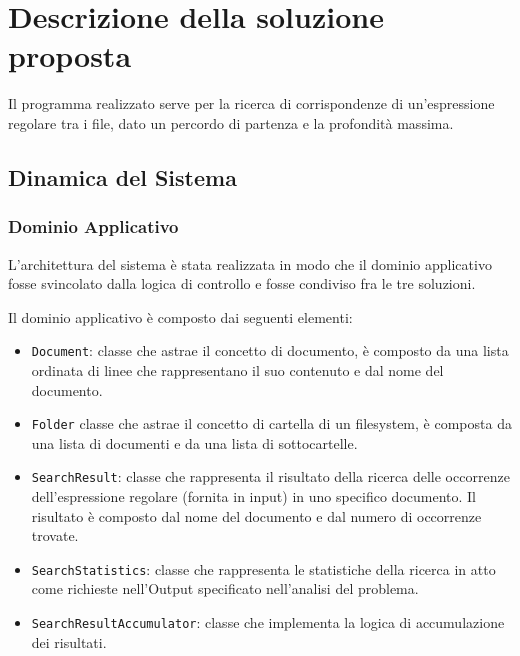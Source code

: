 \documentclass[a4paper]{article}
\begin{document}
\section{Descrizione della soluzione proposta}\label{descrizione-della-soluzione-proposta}

Il programma realizzato serve per la ricerca di corrispondenze di un'espressione regolare tra i file, dato un percordo di partenza e la profondit\`a massima.
%

\subsection{Dinamica del Sistema}

\subsubsection{Dominio Applicativo}

L'architettura del sistema \`e stata realizzata in modo che il dominio applicativo fosse svincolato dalla logica di controllo e fosse condiviso fra le tre soluzioni.

Il dominio applicativo \`e composto dai seguenti elementi:

\begin{itemize}

    \item \texttt{Document}: classe che astrae il concetto di documento, \`e composto da una lista ordinata di linee che rappresentano il suo contenuto e dal nome del documento.

    \item \texttt{Folder} classe che astrae il concetto di cartella di un filesystem, \`e composta da una lista di documenti e da una lista di sottocartelle.

    \item \texttt{SearchResult}: classe che rappresenta il risultato della ricerca delle occorrenze dell'espressione regolare (fornita in input) in uno specifico documento.
%
Il risultato \`e composto dal nome del documento e dal numero di occorrenze trovate.

    \item \texttt{SearchStatistics}: classe che rappresenta le statistiche della ricerca in atto come richieste nell'Output specificato nell'analisi del problema.
%

    \item \texttt{SearchResultAccumulator}: classe che implementa la logica di accumulazione dei risultati.

\end{itemize}
\end{document}
